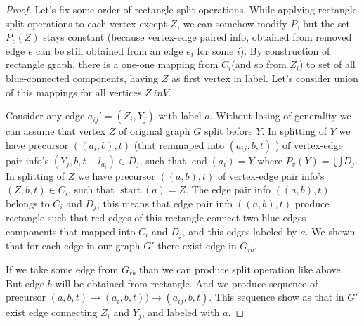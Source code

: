 \documentclass[12pt,a4paper,oneside]{article}
\begin{document}
\begin{proof}
Let's fix some order of rectangle split operations.
While applying rectangle split operations to each vertex except $Z$, we can somehow modify $P$, but the set $P_v(Z)$ stays constant (because vertex-edge paired info, obtained from removed edge $e$ can be still obtained from an edge $e_i$ for some $i$). By construction of rectangle graph, there is a one-one mapping from $C_i$(and so from $Z_i$) to set of all blue-connected components, having $Z$ as first vertex in label. Let's consider union of this mappings for all vertices $Z \ in V$. 

Consider any edge $a_{ij}'=(Z_i, Y_j)$ with label $a$. 
Without losing of generality we can assume that vertex $Z$ of original graph $G$ split before $Y$. In splitting of $Y$ we have precursor $((a_{i}, b), t)$ (that remmaped into $(a_{ij}, b, t)$ ) of vertex-edge pair info's $(Y_j, b, t-l_{a_i}) \in D_j$, such that $\mathop{end}(a_{i}) = Y$ where $P_v(Y) = \bigcup D_j$. In splitting of $Z$ we have precursor $((a, b), t)$ of vertex-edge pair info's $(Z, b, t) \in C_i$, such that $\mathop{start}(a) = Z$. The edge pair info $((a, b), t)$ belongs to $C_i$ and $D_j$, this means that edge pair info $((a, b), t)$ produce rectangle such that red edges of this rectangle connect two blue edges  components that mapped into $C_i$ and $D_j$, and this edges labeled by $a$. We shown that for each edge in our graph $G'$ there exist edge in $G_{rb}$.

If we take some edge from $G_{rb}$ than we can produce split operation like above. But edge $b$ will be obtained from rectangle. And we produce sequence of precursor $(a,b,t)\rightarrow (a_i,b,t))\rightarrow (a_{ij},b,t)$. This sequence show as that in $G'$ exist edge connecting $Z_i$ and $Y_j$, and labeled with $a$. 
\end{proof}
\end{document}
